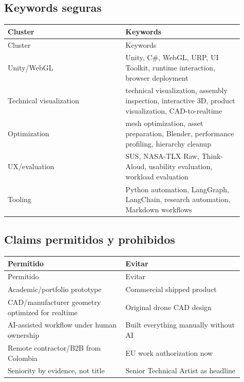 \subsection{Keywords seguras}


\begin{center}
\scriptsize
\begin{longtable}{>{\raggedright\arraybackslash}p{0.455\linewidth} >{\raggedright\arraybackslash}p{0.455\linewidth}}
\toprule
Cluster & Keywords \\
\midrule
\endfirsthead
\toprule
Cluster & Keywords \\
\midrule
\endhead
Unity/WebGL & Unity, C\#, WebGL, URP, UI Toolkit, runtime interaction, browser deployment \\
Technical visualization & technical visualization, assembly inspection, interactive 3D, product visualization, CAD-to-realtime \\
Optimization & mesh optimization, asset preparation, Blender, performance profiling, hierarchy cleanup \\
UX/evaluation & SUS, NASA-TLX Raw, Think-Aloud, usability evaluation, workload evaluation \\
Tooling & Python automation, LangGraph, LangChain, research automation, Markdown workflows \\
\bottomrule
\end{longtable}
\end{center}


\subsection{Claims permitidos y prohibidos}


\begin{center}
\scriptsize
\begin{longtable}{>{\raggedright\arraybackslash}p{0.455\linewidth} >{\raggedright\arraybackslash}p{0.455\linewidth}}
\toprule
Permitido & Evitar \\
\midrule
\endfirsthead
\toprule
Permitido & Evitar \\
\midrule
\endhead
Academic/portfolio prototype & Commercial shipped product \\
CAD/manufacturer geometry optimized for realtime & Original drone CAD design \\
AI-assisted workflow under human ownership & Built everything manually without AI \\
Remote contractor/B2B from Colombia & EU work authorization now \\
Seniority by evidence, not title & Senior Technical Artist as headline \\
\bottomrule
\end{longtable}
\end{center}


